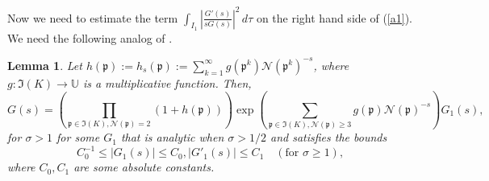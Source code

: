 \documentclass[11pt]{amsart}
\newtheorem{lemma}{Lemma}[section]
\theoremstyle{definition}
\DeclareMathOperator*{\E}{\mathbb{E}}
\newcommand{\NN}{{\mathcal N}}
\newcommand{\U}{{\mathbb U}}
\newcommand{\mf}{\mathfrak}
\newcommand{\FM}[1]{{\color{violet}{{#1}}}}
\newcommand{\AK}[1]{{\color{ForestGreen}{{#1}}}}
\begin{document}


Now we need to estimate the term
$\int_{I_{1}}\left|\frac{G'(s)}{s G(s)}\right|^{2}\,d\tau$
 on the right hand side of  (\ref{a1}).   
We need the following analog of  \cite[Lemma~6.6]{E79book}.

\begin{lemma}\label{eulerproduct1}
Let $h(\mf p):=h_{s}(\mf p):=\sum_{k=1}^{\infty}g(\mf p^{k})\NN(\mf p^{k})^{-s}$, where $g: \mf I(K) \to \U$ is a multiplicative function. Then,
$$G(s)=\left(\prod_{\mf p \in \mf I(K), \NN(\mf p)=2}(1+h(\mf p))\right)\exp\left(\sum_{\mf p \in \mf I(K), \NN(\mf p)\geq 3}g(\mf p)\NN(\mf p)^{-s}\right)G_{1}(s),$$
for $\sigma>1$ for some $G_{1}$ that is analytic when $\sigma>1/2$ and satisfies the bounds
$$C_0^{-1}\leq \vert G_{1}(s)\vert\leq C_0, \vert G'_{1}(s)\vert\leq C_1 \quad (\text{for }\sigma \geq 1),$$
where $C_0, C_1$ are some absolute constants.



\end{lemma}
\end{document}
